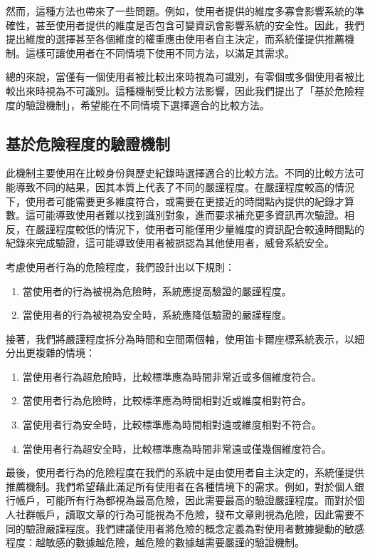 然而，這種方法也帶來了一些問題。例如，使用者提供的維度多寡會影響系統的準確性，甚至使用者提供的維度是否包含可變資訊會影響系統的安全性。因此，我們提出維度的選擇甚至各個維度的權重應由使用者自主決定，而系統僅提供推薦機制。這樣可讓使用者在不同情境下使用不同方法，以滿足其需求。

總的來說，當僅有一個使用者被比較出來時視為可識別，有零個或多個使用者被比較出來時視為不可識別。這種機制受比較方法影響，因此我們提出了「基於危險程度的驗證機制」，希望能在不同情境下選擇適合的比較方法。
\subsection{基於危險程度的驗證機制}
此機制主要使用在比較身份與歷史紀錄時選擇適合的比較方法。不同的比較方法可能導致不同的結果，因其本質上代表了不同的嚴謹程度。在嚴謹程度較高的情況下，使用者可能需要更多維度符合，或需要在更接近的時間點內提供的紀錄才算數。這可能導致使用者難以找到識別對象，進而要求補充更多資訊再次驗證。相反，在嚴謹程度較低的情況下，使用者可能僅用少量維度的資訊配合較遠時間點的紀錄來完成驗證，這可能導致使用者被誤認為其他使用者，威脅系統安全。

考慮使用者行為的危險程度，我們設計出以下規則：
\begin{enumerate}
  \item 當使用者的行為被視為危險時，系統應提高驗證的嚴謹程度。
  \item 當使用者的行為被視為安全時，系統應降低驗證的嚴謹程度。
\end{enumerate}

接著，我們將嚴謹程度拆分為時間和空間兩個軸，使用笛卡爾座標系統表示，以細分出更複雜的情境：
\begin{enumerate}
  \item 當使用者行為超危險時，比較標準應為時間非常近或多個維度符合。
  \item 當使用者行為危險時，比較標準應為時間相對近或維度相對符合。
  \item 當使用者行為安全時，比較標準應為時間相對遠或維度相對不符合。
  \item 當使用者行為超安全時，比較標準應為時間非常遠或僅幾個維度符合。
\end{enumerate}

最後，使用者行為的危險程度在我們的系統中是由使用者自主決定的，系統僅提供推薦機制。我們希望藉此滿足所有使用者在各種情境下的需求。例如，對於個人銀行帳戶，可能所有行為都視為最高危險，因此需要最高的驗證嚴謹程度。而對於個人社群帳戶，讀取文章的行為可能視為不危險，發布文章則視為危險，因此需要不同的驗證嚴謹程度。我們建議使用者將危險的概念定義為對使用者數據變動的敏感程度：越敏感的數據越危險，越危險的數據越需要嚴謹的驗證機制。
